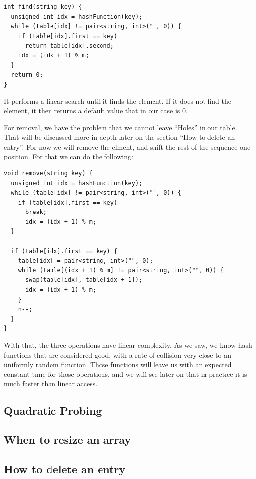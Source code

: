 \begin{lstlisting}
int find(string key) {
  unsigned int idx = hashFunction(key);
  while (table[idx] != pair<string, int>("", 0)) {
    if (table[idx].first == key) 
      return table[idx].second;
    idx = (idx + 1) % m;
  }
  return 0;
}
\end{lstlisting}

It performs a linear search until it finds the element. If it does not find the element, it then returns a default value that in our case is 0. 

For removal, we have the problem that we cannot leave ``Holes'' in our table. That will be discussed more in depth later on the section ``How to delete an entry''. For now we will remove the elment, and shift the rest of the sequence one position. For that we can do the following:

\begin{lstlisting}
void remove(string key) {
  unsigned int idx = hashFunction(key);
  while (table[idx] != pair<string, int>("", 0)) {
    if (table[idx].first == key) 
      break;
      idx = (idx + 1) % m;
  }
    
  if (table[idx].first == key) {
    table[idx] = pair<string, int>("", 0);
    while (table[(idx + 1) % m] != pair<string, int>("", 0)) {
      swap(table[idx], table[idx + 1]);
      idx = (idx + 1) % m;
    }
    n--;
  }  
}
\end{lstlisting}

With that, the three operations have linear complexity. As we saw, we know hash functions that are considered good, with a rate of collision very close to an uniformly random function. Those functions will leave us with an expected constant time for those operations, and we will see later on that in practice it is much faster than linear access.

\subsection{Quadratic Probing}

\subsection{When to resize an array}

\subsection{How to delete an entry}

